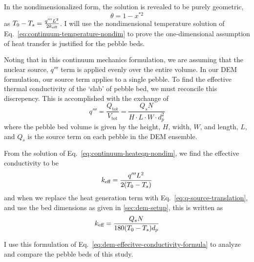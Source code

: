 In the nondimensionalized form, the solution is revealed to be purely geometric,
\begin{equation}\label{eq:continuum-temperature-nondim}
    \theta = 1-x^{*2}
\end{equation}
as $T_0  - T_s = \frac{q'''L^2}{2k_\text{eff}}$. I will use the nondimensional temperature solution of Eq.~\ref{eq:continuum-temperature-nondim} to prove the one-dimensional assumption of heat transfer is justified for the pebble beds.

Noting that in this continuum mechanics formulation, we are assuming that the nuclear source, $q'''$ term is applied evenly over the entire volume. In our DEM formulation, our source term applies to a single pebble. To find the effective thermal conductivity of the `slab' of pebble bed, we must reconcile this discrepency. This is accomplished with the exchange of
\begin{equation}\label{eq:q-source-translation}
    q''' = \frac{Q_\text{tot}}{V_\text{tot}} = \frac{Q_sN}{H\cdot L\cdot W\cdot d_p^2}
\end{equation}
where the pebble bed volume is given by the height, $H$, width, $W$, and length, $L$, and $Q_s$ is the source term on each pebble in the DEM ensemble. 

From the solution of Eq.~\ref{eq:continuum-heateqn-nondim}, we find the effective conductivity to be
\begin{equation}
    k_\text{eff} = \frac{q''' L^2}{2(T_0-T_s)}
\end{equation}
and when we replace the heat generation term with Eq.~\ref{eq:q-source-translation}, and use the bed dimensions as given in \cref{sec:dem-setup}, this is written as
\begin{equation}\label{eq:dem-effecitve-conductivity-formula}
    k_\text{eff} = \frac{Q_sN}{180(T_0-T_s)d_p}
\end{equation}

I use this formulation of Eq.~\ref{eq:dem-effecitve-conductivity-formula} to analyze and compare the pebble beds of this study.



